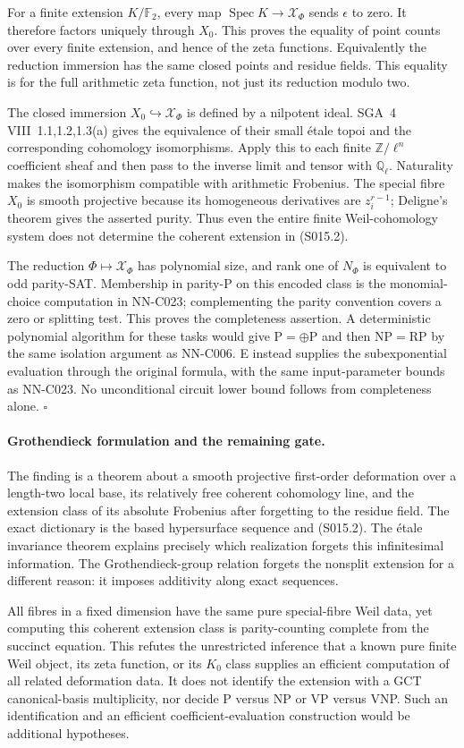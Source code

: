 For a finite extension $K/\mathbb F_2$, every map
$\operatorname{Spec}K\to\mathcal X_\Phi$ sends $\epsilon$ to zero.
It therefore factors uniquely through $X_0$. This proves the
equality of point counts over every finite extension, and hence
of the zeta functions. Equivalently the reduction immersion has
the same closed points and residue fields. This equality is for
the full arithmetic zeta function, not just its reduction modulo two.

The closed immersion $X_0\hookrightarrow\mathcal X_\Phi$ is defined
by a nilpotent ideal. SGA~4 VIII~1.1,1.2,1.3(a) gives the
equivalence of their small \'etale topoi and the corresponding
cohomology isomorphisms. Apply this to each finite
$\mathbb Z/\ell^n$ coefficient sheaf and then pass to the inverse
limit and tensor with $\mathbb Q_\ell$. Naturality makes the
isomorphism compatible with arithmetic Frobenius. The special
fibre $X_0$ is smooth projective because its homogeneous derivatives
are $z_i^{r-1}$; Deligne's theorem gives the asserted purity.
Thus even the entire finite Weil-cohomology system does not
determine the coherent extension in (S015.2).

The reduction $\Phi\mapsto\mathcal X_\Phi$ has polynomial size,
and rank one of $N_\Phi$ is equivalent to odd parity-SAT. Membership
in parity-P on this encoded class is the monomial-choice computation
in NN-C023; complementing the parity convention covers a zero or
splitting test. This proves the completeness assertion.
A deterministic polynomial algorithm for these tasks would give
$\mathrm P=\oplus\mathrm P$ and then $\mathrm{NP}=\mathrm{RP}$
by the same isolation argument as NN-C006. E instead supplies the
subexponential evaluation through the original formula, with the
same input-parameter bounds as NN-C023. No unconditional circuit
lower bound follows from completeness alone.
\hfill$\square$

\paragraph{Grothendieck formulation and the remaining gate.}
The finding is a theorem about a smooth projective first-order
deformation over a length-two local base, its relatively free
coherent cohomology line, and the extension class of its absolute
Frobenius after forgetting to the residue field. The exact
dictionary is the based hypersurface sequence and (S015.2).
The \'etale invariance theorem explains precisely which realization
forgets this infinitesimal information. The Grothendieck-group
relation forgets the nonsplit extension for a different reason:
it imposes additivity along exact sequences.

All fibres in a fixed dimension have the same pure special-fibre
Weil data, yet computing this coherent extension class is
parity-counting complete from the succinct equation. This refutes
the unrestricted inference that a known pure finite Weil object,
its zeta function, or its $K_0$ class supplies an efficient
computation of all related deformation data. It does not identify
the extension with a GCT canonical-basis multiplicity, nor decide
P versus NP or VP versus VNP. Such an identification and an efficient
coefficient-evaluation construction would be additional hypotheses.
